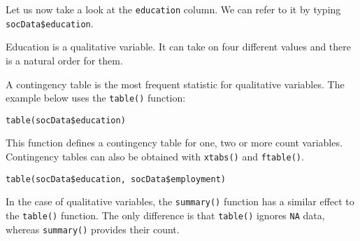 \documentclass[]{book}
\theoremstyle{definition}
\theoremstyle{definition}
\theoremstyle{definition}
\theoremstyle{remark}
\begin{document}
Let us now take a look at the \texttt{education} column. We can refer to
it by typing \texttt{socData\$education}.

Education is a qualitative variable. It can take on four different
values and there is a natural order for them.

A contingency table is the most frequent statistic for qualitative
variables. The example below uses the \texttt{table()} function:

\begin{verbatim}
table(socData$education)
\end{verbatim}

This function defines a contingency table for one, two or more count
variables. Contingency tables can also be obtained with \texttt{xtabs()}
and \texttt{ftable()}.

\begin{verbatim}
table(socData$education, socData$employment)
\end{verbatim}

In the case of qualitative variables, the \texttt{summary()} function
has a similar effect to the \texttt{table()} function. The only
difference is that \texttt{table()} ignores \texttt{NA} data, whereas
\texttt{summary()} provides their count.
\end{document}
